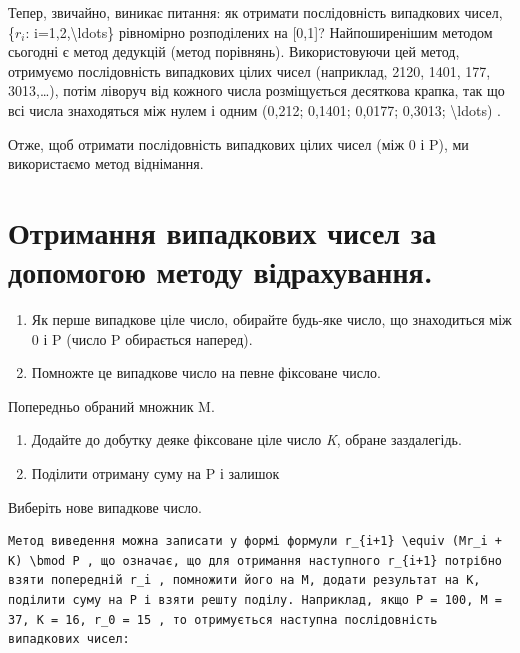 \documentclass[
]{article}
\begin{document}
{{{Тепер, звичайно, виникає питання: як отримати послідовність випадкових
чисел, \{\(r_i\): i=1,2,\textbackslash ldots\} рівномірно розподілених
на {[}0,1{]}? Найпоширенішим методом сьогодні є метод дедукцій (метод
порівнянь). Використовуючи цей метод, отримуємо послідовність випадкових
цілих чисел (наприклад, 2120, 1401, 177, 3013,\ldots), потім ліворуч від
кожного числа розміщується десяткова крапка, так що всі числа
знаходяться між нулем і одним (0,212; 0,1401; 0,0177; 0,3013;
\textbackslash ldots) .

Отже, щоб отримати послідовність випадкових цілих чисел (між 0 і P), ми
використаємо метод віднімання.

\section{Отримання випадкових чисел за допомогою методу
відрахування.}\label{ux43eux442ux440ux438ux43cux430ux43dux43dux44f-ux432ux438ux43fux430ux434ux43aux43eux432ux438ux445-ux447ux438ux441ux435ux43b-ux437ux430-ux434ux43eux43fux43eux43cux43eux433ux43eux44e-ux43cux435ux442ux43eux434ux443-ux432ux456ux434ux440ux430ux445ux443ux432ux430ux43dux43dux44f.}

\begin{enumerate}
\def\labelenumi{\arabic{enumi}.}
\item
  Як перше випадкове ціле число, обирайте будь-яке число, що знаходиться
  між 0 і P (число P обирається наперед).
\item
  Помножте це випадкове число на певне фіксоване число.
\end{enumerate}

Попередньо обраний множник M.

\begin{enumerate}
\def\labelenumi{\arabic{enumi}.}
\setcounter{enumi}{2}
\item
  Додайте до добутку деяке фіксоване ціле число \emph{K}, обране
  заздалегідь.
\item
  Поділити отриману суму на P і залишок
\end{enumerate}

Виберіть нове випадкове число.

\begin{verbatim}
Метод виведення можна записати у формі формули r_{i+1} \equiv (Mr_i + K) \bmod P , що означає, що для отримання наступного r_{i+1} потрібно взяти попередній r_i , помножити його на M, додати результат на K, поділити суму на P і взяти решту поділу. Наприклад, якщо P = 100, M = 37, K = 16, r_0 = 15 , то отримується наступна послідовність випадкових чисел:
\end{verbatim}

}}}
\end{document}
